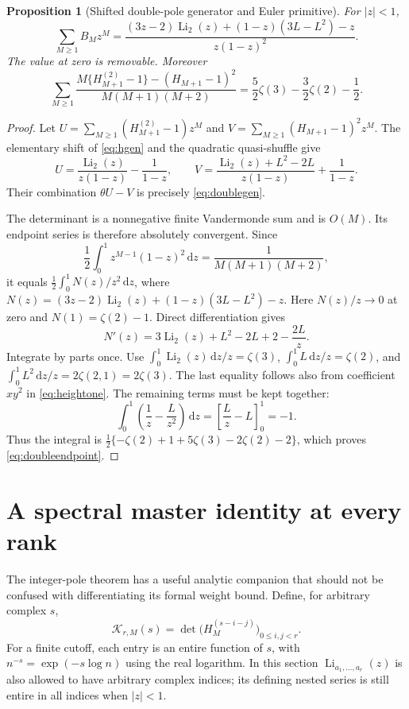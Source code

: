 \documentclass[11pt,letterpaper]{article}
\numberwithin{equation}{section}
\newtheorem{proposition}[theorem]{Proposition}
\theoremstyle{definition}\newtheorem{definition}[theorem]{Definition}
\theoremstyle{remark}\newtheorem{remark}[theorem]{Remark}
\newcommand{\dd}{\,\mathrm d}\newcommand{\Li}{\operatorname{Li}}
\begin{document}
\begin{proposition}[Shifted double-pole generator and Euler primitive]
\label{thm:shifteddouble}
For $|z|<1$,
\begin{equation}\label{eq:doublegen}
 \boxed{\displaystyle
 \sum_{M\ge1}B_Mz^M=
 \frac{(3z-2)\Li_2(z)+(1-z)(3L-L^2)-z}{z(1-z)^2}.}
\end{equation}
The value at zero is removable. Moreover
\begin{equation}\label{eq:doubleendpoint}
 \boxed{\displaystyle
 \sum_{M\ge1}\frac{M\{H_{M+1}^{(2)}-1\}-(H_{M+1}-1)^2}
                       {M(M+1)(M+2)}
       =\frac52\zeta(3)-\frac32\zeta(2)-\frac12.}
\end{equation}
\end{proposition}
\begin{proof}
Let $U=\sum_{M\ge1}(H_{M+1}^{(2)}-1)z^M$ and
$V=\sum_{M\ge1}(H_{M+1}-1)^2z^M$. The elementary shift of
\eqref{eq:hgen} and the quadratic quasi-shuffle give
\[
 U=\frac{\Li_2(z)}{z(1-z)}-\frac1{1-z},\qquad
 V=\frac{\Li_2(z)+L^2-2L}{z(1-z)}+\frac1{1-z}.
\]
Their combination $\theta U-V$ is precisely \eqref{eq:doublegen}.

The determinant is a nonnegative finite Vandermonde sum and is $O(M)$.
Its endpoint series is therefore absolutely convergent. Since
\[
 \frac12\int_0^1z^{M-1}(1-z)^2\dd z=\frac1{M(M+1)(M+2)},
\]
it equals $\tfrac12\int_0^1N(z)/z^2\dd z$, where
$N(z)=(3z-2)\Li_2(z)+(1-z)(3L-L^2)-z$.
Here $N(z)/z\to0$ at zero and $N(1)=\zeta(2)-1$. Direct
differentiation gives
\[
 N'(z)=3\Li_2(z)+L^2-2L+2-\frac{2L}{z}.
\]
Integrate by parts once. Use
$\int_0^1\Li_2(z)\dd z/z=\zeta(3)$,
$\int_0^1L\dd z/z=\zeta(2)$, and
$\int_0^1L^2\dd z/z=2\zeta(2,1)=2\zeta(3)$.
The last equality follows also from coefficient $xy^2$ in
\eqref{eq:heightone}. The remaining terms must be kept together:
\[
 \int_0^1\left(\frac1z-\frac{L}{z^2}\right)\dd z
       =\left[\frac Lz-L\right]_0^1=-1.
\]
Thus the integral is
$\tfrac12\{-\zeta(2)+1+5\zeta(3)-2\zeta(2)-2\}$,
which proves \eqref{eq:doubleendpoint}.
\end{proof}

\section{A spectral master identity at every rank}
\label{sec:spectral}

The integer-pole theorem has a useful analytic companion that should
not be confused with differentiating its formal weight bound. Define,
for arbitrary complex $s$,
\begin{equation}\label{eq:spectraldet}
 \mathcal K_{r,M}(s)=
            \det\bigl(H_M^{(s-i-j)}\bigr)_{0\le i,j<r}.
\end{equation}
For a finite cutoff, each entry is an entire function of $s$, with
$n^{-s}=\exp(-s\log n)$ using the real logarithm. In this section
$\Li_{a_1,\ldots,a_r}(z)$ is also allowed to have arbitrary complex
indices; its defining nested series is still entire in all indices
when $|z|<1$.
\end{document}
